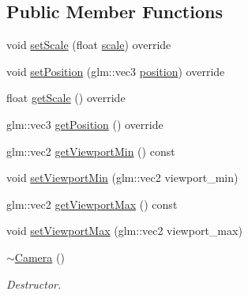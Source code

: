 \subsection*{Public Member Functions}
\begin{DoxyCompactItemize}
\item 
void \hyperlink{class_mason_1_1_camera_af7aa6752699108d282996199549a704b}{set\+Scale} (float \hyperlink{class_mason_1_1_transform_a0a12711710700aca2523630c1014dc17}{scale}) override
\item 
void \hyperlink{class_mason_1_1_camera_a69f184af46d081b85209040bbe814cbb}{set\+Position} (glm\+::vec3 \hyperlink{class_mason_1_1_transform_ac9e11b4ec4433a38ac1100f12c955dcb}{position}) override
\item 
float \hyperlink{class_mason_1_1_camera_a9c86fd4a182c472001f5d52e99fc0bbc}{get\+Scale} () override
\item 
glm\+::vec3 \hyperlink{class_mason_1_1_camera_a71560b8b6216a542ae1958bd91a4361d}{get\+Position} () override
\item 
glm\+::vec2 \hyperlink{class_mason_1_1_camera_a0d2d26d8b7b80ab508ed4f4f537614b5}{get\+Viewport\+Min} () const
\item 
void \hyperlink{class_mason_1_1_camera_aa630259d7e0c0124dec5c9aaf33b7160}{set\+Viewport\+Min} (glm\+::vec2 viewport\+\_\+min)
\item 
glm\+::vec2 \hyperlink{class_mason_1_1_camera_abe43550148e85f5a32919a3c8b8ff115}{get\+Viewport\+Max} () const
\item 
void \hyperlink{class_mason_1_1_camera_a1f9a7896bb617d1402e3c4738324e1ea}{set\+Viewport\+Max} (glm\+::vec2 viewport\+\_\+max)
\item 
\hyperlink{class_mason_1_1_camera_ad1897942d0ccf91052386388a497349f}{$\sim$\+Camera} ()
\begin{DoxyCompactList}\small\item\em Destructor. \end{DoxyCompactList}\end{DoxyCompactItemize}
